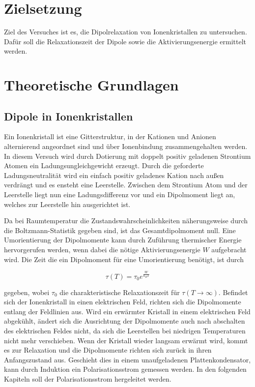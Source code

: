 \section{Zielsetzung}
Ziel des Versuches ist es, die Dipolrelaxation von Ionenkristallen zu untersuchen.
Dafür soll die Relaxationszeit der Dipole sowie die Aktivierungsenergie ermittelt werden.

\section{Theoretische Grundlagen}
\subsection{Dipole in Ionenkristallen}
Ein Ionenkristall ist eine Gitterstruktur, in der Kationen und Anionen alternierend angeordnet sind und über Ionenbindung zusammengehalten werden.
In diesem Versuch wird durch Dotierung mit doppelt positiv geladenen Strontium Atomen ein Ladungsungleichgewicht erzeugt.
Durch die geforderte Ladungsneutralität wird ein einfach positiv geladenes Kation nach außen verdrängt und es ensteht eine Leerstelle.
Zwischen dem Strontium Atom und der Leerstelle liegt nun eine Ladungsdifferenz vor und ein Dipolmoment liegt an, welches zur Leerstelle hin ausgerichtet ist.

\noindent
Da bei Raumtemperatur die Zustandswahrscheinlichkeiten näherungsweise durch die Boltzmann-Statistik gegeben sind, ist das Gesamtdipolmoment null.
Eine Umorientierung der Dipolmomente kann durch Zuführung thermischer Energie hervorgerufen werden, wenn dabei die nötige Aktivierungsenergie $W$ aufgebracht wird.
Die Zeit die ein Dipolmoment für eine Umorientierung benötigt, ist durch 

\begin{equation}
    \label{eqn:tau}
    \tau(T) = \tau_0 e^{\frac{W}{k_B T}}
\end{equation}

\noindent
gegeben, wobei $\tau_0$ die charakteristische Relaxationszeit für $\tau(T \to \infty)$.
Befindet sich der Ionenkristall in einen elektrischen Feld, richten sich die Dipolmomente entlang der Feldlinien aus.
Wird ein erwärmter Kristall in einem elektrischen Feld abgekühlt, ändert sich die Ausrichtung der Dipolmomente auch nach abschalten des elektrischen Feldes nicht, da sich die Leerstellen bei niedrigen Temperaturen nicht mehr verschieben.
Wenn der Kristall wieder langsam erwärmt wird, kommt es zur Relaxation und die Dipolmomente richten sich zurück in ihren Anfangszustand aus.
Geschieht dies in einem unaufgeladenen Plattenkondensator, kann durch Induktion ein Polarisationsstrom gemessen werden.
In den folgenden Kapiteln soll der Polarisationsstrom hergeleitet werden.

